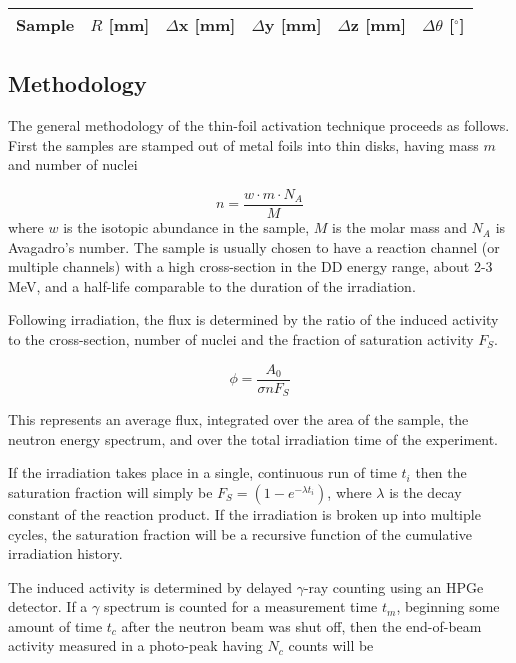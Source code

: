 \documentclass[aps,twocolumn,secnumarabic,balancelastpage,amsmath,amssymb,nofootinbib,floatfix]{revtex4-1}
\begin{document}
\begin{ruledtabular}
\begin{tabular}{cccccc}
Sample & $R$ [mm]& $\Delta$x [mm] & $\Delta$y [mm] & $\Delta$z [mm] & $\Delta \theta$ [$^{\circ}$] \\ 
\hline

\end{tabular}
\end{ruledtabular}

\subsection{Methodology}

The general methodology of the thin-foil activation technique proceeds as follows.  First the samples are stamped out of metal foils into thin disks, having mass $m$ and number of nuclei

\begin{equation}
n=\frac{w\cdot m \cdot N_A}{M}
\label{eq:number_density}
\end{equation}
where $w$ is the isotopic abundance in the sample, $M$ is the molar mass and $N_A$ is Avagadro's number.  The sample is usually chosen to have a reaction channel (or multiple channels) with a high cross-section in the DD energy range, about 2-3 MeV, and a half-life comparable to the duration of the irradiation.

Following irradiation, the flux is determined by the ratio of the induced activity to the cross-section, number of nuclei and the fraction of saturation activity $F_S$.

\begin{equation}
\phi = \frac{A_0}{\sigma n F_S}
\label{eq:flux_calc}
\end{equation}

This represents an average flux, integrated over the area of the sample, the neutron energy spectrum, and over the total irradiation time of the experiment.

If the irradiation takes place in a single, continuous run of time $t_i$ then the saturation fraction will simply be $F_S = (1-e^{-\lambda t_i})$, where $\lambda$ is the decay constant of the reaction product.  If the irradiation is broken up into multiple cycles, the saturation fraction will be a recursive function of the cumulative irradiation history.

The induced activity is determined by delayed $\gamma$-ray counting using an HPGe detector.  If a $\gamma$ spectrum is counted for a measurement time $t_m$, beginning some amount of time $t_c$ after the neutron beam was shut off, then the end-of-beam activity measured in a photo-peak having $N_c$ counts will be
\end{document}
